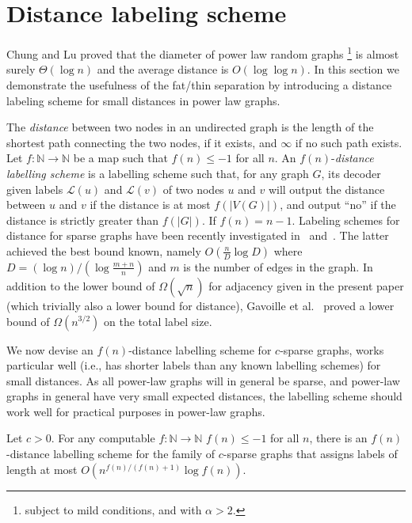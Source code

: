 \section{Distance labeling scheme}\label{Sec:Distance}
Chung and Lu \cite{chung2004average}  proved that the diameter of  power law random graphs \footnote{subject to mild conditions, and with $\alpha > 2$.}  is almost surely $\Theta(\log n)$ and the average distance is $O(\log \log n)$. 
In this section we demonstrate the usefulness of the fat/thin separation by introducing  a distance labeling scheme for small distances in power law graphs. 



The \emph{distance} between two nodes in an undirected graph is the length of the shortest path connecting the two nodes, if it exists, and $\infty$ if no such path exists.
Let $f : \mathbb{N} \longrightarrow \mathbb{N}$ be a map such that $f(n) \leq  -1$ for all $n$. An $f(n)$-\emph{distance labelling scheme} is a labelling
scheme such that, for any graph $G$, its decoder given labels $\mathcal{L}(u)$ and $\mathcal{L}(v)$ of two nodes $u$ and $v$
will output the distance between $u$ and $v$ if the distance is at most $f(\vert V(G) \vert)$, and output ``no'' if the distance
is  strictly greater than $f(\vert G \vert)$. If $f(n) = n-1$.
Labeling schemes for distance for sparse graphs have been recently investigated in~\cite{DBLP:journals/corr/AlstrupDKP15} and~\cite{DBLP:journals/corr/GawrychowskiKU15}.
The latter achieved the best bound known, namely $O(\frac{n}{D} \log D)$ where $D = (\log n)/(\log \frac{m+n}{n})$ and $m$ is the number of edges
in the graph.  
In addition to the lower bound of $\Omega(\sqrt{n})$ for adjacency given in the present paper (which trivially also a lower bound for distance), Gavoille et al.~\cite{gavoillea2004distance} proved a lower bound of  $\Omega(n^{3/2})$ on the total label size.

We now devise an $f(n)$-distance labelling scheme for $c$-sparse graphs,
works particular well (i.e., has shorter labels than any known labelling schemes) for small distances. As
all power-law graphs will in general be sparse, and power-law graphs in general
have very small expected distances, the labelling scheme should work well for practical purposes in power-law graphs.

\begin{lemma}\label{lem:sparse_small_dist}
Let $c > 0$. For any computable $f : \mathbb{N} \longrightarrow \mathbb{N}$ 
$f(n) \leq  -1$ for all $n$, there is an $f(n)$-distance labelling scheme for the family of $c$-sparse graphs
that assigns labels of length at most $O(n^{f(n)/(f(n) + 1)} \log f(n))$.
\end{lemma}


